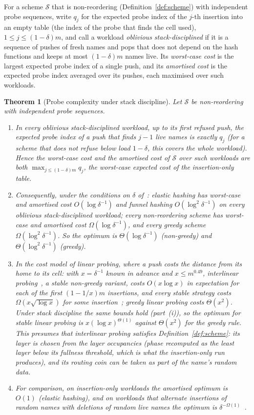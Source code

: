 \documentclass[11pt,a4paper]{article}
\newtheorem{theorem}{Theorem}
\theoremstyle{definition}
\theoremstyle{remark}
\begin{document}
For a scheme $\mathcal S$ that is non-reordering (Definition~\ref{def:scheme}) with independent probe sequences, write $q_j$ for the expected probe index of the $j$-th insertion into an empty table (the index of the probe that finds the cell used), $1\le j\le(1-\delta)m$, and call a workload \emph{oblivious stack-disciplined} if it is a sequence of pushes of fresh names and pops that does not depend on the hash functions and keeps at most $(1-\delta)m$ names live. Its \emph{worst-case cost} is the largest expected probe index of a single push, and its \emph{amortised cost} is the expected probe index averaged over its pushes, each maximised over such workloads.

\begin{theorem}[Probe complexity under stack discipline]\label{thm:sep}
Let $\mathcal S$ be non-reordering with independent probe sequences.
\begin{enumerate}[label=(\roman*),leftmargin=*,nosep]
\item In every oblivious stack-disciplined workload, up to its first refused push, the expected probe index of a push that finds $j-1$ live names is exactly $q_j$ (for a scheme that does not refuse below load $1-\delta$, this covers the whole workload). Hence the worst-case cost and the amortised cost of $\mathcal S$ over such workloads are both $\max_{j\le(1-\delta)m}q_j$, the worst-case expected cost of the insertion-only table.
\item Consequently, under the conditions on $\delta$ of~\cite{fkk2024}: elastic hashing has worst-case and amortised cost $O(\log\delta^{-1})$ and funnel hashing $O(\log^2\delta^{-1})$ on every oblivious stack-disciplined workload; every non-reordering scheme has worst-case and amortised cost $\Omega(\log\delta^{-1})$, and every greedy scheme $\Omega(\log^2\delta^{-1})$. So the optimum is $\Theta(\log\delta^{-1})$ (non-greedy) and $\Theta(\log^2\delta^{-1})$ (greedy).
\item In the cost model of linear probing, where a push costs the distance from its home to its cell: with $x=\delta^{-1}$ known in advance and $x\le m^{0.49}$, interlinear probing~\cite{kkw2026}, a stable non-greedy variant, costs $O(x\log x)$ in expectation for each of the first $(1-1/x)m$ insertions, and every stable strategy costs $\Omega(x\sqrt{\log x})$ for some insertion~\cite{kkw2026}; greedy linear probing costs $\Theta(x^2)$. Under stack discipline the same bounds hold (part~(i)), so the optimum for stable linear probing is $x(\log x)^{\Theta(1)}$ against $\Theta(x^2)$ for the greedy rule. This presumes that interlinear probing satisfies Definition~\ref{def:scheme}: its layer is chosen from the layer occupancies (phase recomputed as the least layer below its fullness threshold, which is what the insertion-only run produces), and its routing coin can be taken as part of the name's random data.
\item For comparison, on insertion-only workloads the amortised optimum is $O(1)$ (elastic hashing), and on workloads that alternate insertions of random names with deletions of random live names the optimum is $\delta^{-\Omega(1)}$~\cite{fkk2024,tinypointers2025}.
\end{enumerate}
\end{theorem}
\end{document}

